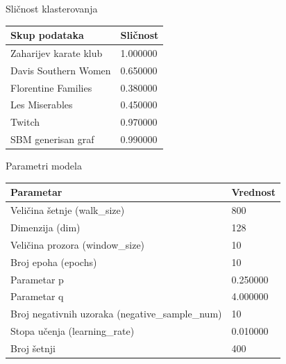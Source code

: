 \documentclass{beamer}
\begin{document}
\begin{frame}{Sličnost klasterovanja}
    \centering
    \begin{table}
        \label{tab:4.11}
        \begin{tabular}{p{1in}p{1in}}
        \hline
        Skup podataka & Sličnost \\
        \hline
        Zaharijev karate klub & 1.000000 \\
        Davis Southern Women & 0.650000 \\
        Florentine Families & 0.380000 \\
        Les Miserables & 0.450000 \\
        Twitch & 0.970000 \\
        SBM generisan graf & 0.990000 \\
        \hline
    \end{tabular}
    \end{table}
\end{frame}

\begin{frame}{Parametri modela}
    \centering
    \begin{table}
        \label{tab:4.12}
        \begin{tabular}{p{2in}p{2in}}
        \hline
        Parametar & Vrednost \\
        \hline
        Veličina šetnje (walk\_size) & 800 \\
        Dimenzija (dim) & 128 \\
        Veličina prozora (window\_size) & 10 \\
        Broj epoha (epochs) & 10 \\
        Parametar p & 0.250000 \\
        Parametar q & 4.000000 \\
        Broj negativnih uzoraka (negative\_sample\_num) & 10 \\
        Stopa učenja (learning\_rate) & 0.010000 \\
        Broj šetnji & 400 \\
        \hline
    \end{tabular}
\end{table}
\end{frame}
\end{document}
